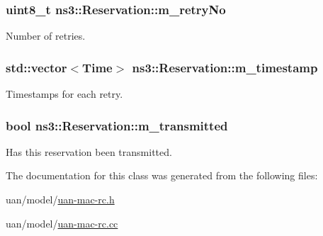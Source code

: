 \subsubsection[{\texorpdfstring{m\+\_\+retry\+No}{m_retryNo}}]{\setlength{\rightskip}{0pt plus 5cm}uint8\+\_\+t ns3\+::\+Reservation\+::m\+\_\+retry\+No\hspace{0.3cm}{\ttfamily [private]}}\hypertarget{classns3_1_1Reservation_aaa54368daa4187d371d5423031fb2837}{}\label{classns3_1_1Reservation_aaa54368daa4187d371d5423031fb2837}
Number of retries. 
\subsubsection[{\texorpdfstring{m\+\_\+timestamp}{m_timestamp}}]{\setlength{\rightskip}{0pt plus 5cm}std\+::vector$<${\bf Time}$>$ ns3\+::\+Reservation\+::m\+\_\+timestamp\hspace{0.3cm}{\ttfamily [private]}}\hypertarget{classns3_1_1Reservation_afcbc679288aaaa33c6718fea6303aae6}{}\label{classns3_1_1Reservation_afcbc679288aaaa33c6718fea6303aae6}
Timestamps for each retry. 
\subsubsection[{\texorpdfstring{m\+\_\+transmitted}{m_transmitted}}]{\setlength{\rightskip}{0pt plus 5cm}bool ns3\+::\+Reservation\+::m\+\_\+transmitted\hspace{0.3cm}{\ttfamily [private]}}\hypertarget{classns3_1_1Reservation_a38ee2269226398d71147fc893cc39c96}{}\label{classns3_1_1Reservation_a38ee2269226398d71147fc893cc39c96}
Has this reservation been transmitted. 

The documentation for this class was generated from the following files\+:\begin{DoxyCompactItemize}
\item 
uan/model/\hyperlink{uan-mac-rc_8h}{uan-\/mac-\/rc.\+h}\item 
uan/model/\hyperlink{uan-mac-rc_8cc}{uan-\/mac-\/rc.\+cc}\end{DoxyCompactItemize}
